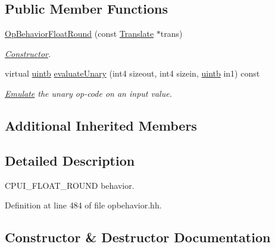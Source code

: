 \subsection*{Public Member Functions}
\begin{DoxyCompactItemize}
\item 
\mbox{\hyperlink{class_op_behavior_float_round_a5e79dd6bef7b5303ea614ae2353d129a}{Op\+Behavior\+Float\+Round}} (const \mbox{\hyperlink{class_translate}{Translate}} $\ast$trans)
\begin{DoxyCompactList}\small\item\em \mbox{\hyperlink{class_constructor}{Constructor}}. \end{DoxyCompactList}\item 
virtual \mbox{\hyperlink{types_8h_a2db313c5d32a12b01d26ac9b3bca178f}{uintb}} \mbox{\hyperlink{class_op_behavior_float_round_aa57d5042b97051885643fb757c8f10a6}{evaluate\+Unary}} (int4 sizeout, int4 sizein, \mbox{\hyperlink{types_8h_a2db313c5d32a12b01d26ac9b3bca178f}{uintb}} in1) const
\begin{DoxyCompactList}\small\item\em \mbox{\hyperlink{class_emulate}{Emulate}} the unary op-\/code on an input value. \end{DoxyCompactList}\end{DoxyCompactItemize}
\subsection*{Additional Inherited Members}


\subsection{Detailed Description}
C\+P\+U\+I\+\_\+\+F\+L\+O\+A\+T\+\_\+\+R\+O\+U\+ND behavior. 

Definition at line 484 of file opbehavior.\+hh.



\subsection{Constructor \& Destructor Documentation}
\mbox{\label{class_op_behavior_float_round_a5e79dd6bef7b5303ea614ae2353d129a}} 
